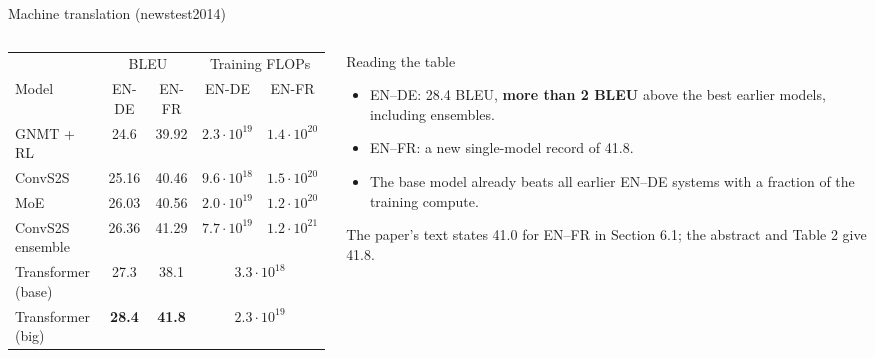 \documentclass[aspectratio=169,11pt]{beamer}
\begin{document}
\begin{frame}{Machine translation (newstest2014)}
  \begin{columns}[T]
    \begin{column}{0.56\textwidth}
      \footnotesize
      \begin{tabular}{@{}lcccc@{}}
        \toprule
        & \multicolumn{2}{c}{BLEU} & \multicolumn{2}{c}{Training FLOPs}\\
        Model & EN-DE & EN-FR & EN-DE & EN-FR\\
        \midrule
        GNMT + RL & 24.6 & 39.92 & $2.3\!\cdot\!10^{19}$ & $1.4\!\cdot\!10^{20}$\\
        ConvS2S & 25.16 & 40.46 & $9.6\!\cdot\!10^{18}$ & $1.5\!\cdot\!10^{20}$\\
        MoE & 26.03 & 40.56 & $2.0\!\cdot\!10^{19}$ & $1.2\!\cdot\!10^{20}$\\
        ConvS2S ensemble & 26.36 & 41.29 & $7.7\!\cdot\!10^{19}$ & $1.2\!\cdot\!10^{21}$\\
        \midrule
        Transformer (base) & 27.3 & 38.1 & \multicolumn{2}{c}{$3.3\!\cdot\!10^{18}$}\\
        Transformer (big) & \textbf{28.4} & \textbf{41.8} & \multicolumn{2}{c}{$2.3\!\cdot\!10^{19}$}\\
        \bottomrule
      \end{tabular}
    \end{column}
    \begin{column}{0.4\textwidth}
      \begin{exampleblock}{Reading the table}
        \small
        \begin{itemize}
          \item EN--DE: 28.4 BLEU, \textbf{more than 2 BLEU} above the best earlier models, including ensembles.
          \item EN--FR: a new single-model record of 41.8.
          \item The base model already beats all earlier EN--DE systems with a fraction of the training compute.
        \end{itemize}
      \end{exampleblock}
      {\scriptsize The paper's text states 41.0 for EN--FR in Section 6.1; the abstract and Table 2 give 41.8.}
    \end{column}
  \end{columns}
\end{frame}
\end{document}
